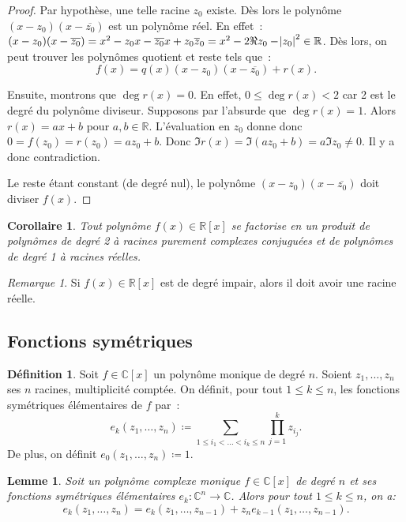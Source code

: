 \documentclass{article}
\newcommand{\R}{\mathbb R}
\newcommand{\C}{\mathbb C}
\newtheorem{cor}[thm]{Corollaire}
\newtheorem{lem}[thm]{Lemme}
\theoremstyle{definition}
\newtheorem{déf}[thm]{Définition}
\theoremstyle{remark}
\newtheorem*{rmq}{Remarque}
\begin{document}
		\begin{proof} Par hypothèse, une telle racine $z_0$ existe. Dès lors le polynôme $(x-z_0)(x-\overline {z_0})$ est un polynôme réel. En effet~:
		$(x-z_0)(x-\overline {z_0}) = x^2 -z_0x - \overline {z_0}x + z_0\overline z_0 = x^2 - 2\Re z_0 - \abs{z_0}^2 \in \R$. Dès lors, on peut trouver les polynômes
		quotient et reste tels que~: \[f(x) = q(x)(x-z_0)(x-\overline {z_0}) + r(x).\]

		Ensuite, montrons que $\deg r(x) = 0$. En effet, $0 \leq \deg r(x) < 2$ car 2 est le degré du polynôme diviseur. Supposons par l'absurde que $\deg r(x) = 1$.
		Alors $r(x) = ax+b$ pour $a, b \in \R$. L'évaluation en $z_0$ donne donc $0 = f(z_0) = r(z_0) = az_0+b$. Donc $\Im r(x) = \Im(az_0+b) = a\Im z_0 \neq 0$. Il y
		a donc contradiction.

		Le reste étant constant (de degré nul), le polynôme $(x-z_0)(x-\overline{z_0})$ doit diviser $f(x)$. \end{proof}

		\begin{cor} Tout polynôme $f(x) \in \R[x]$ se factorise en un produit de polynômes de degré 2 à racines purement complexes conjuguées et de polynômes de
		degré 1 à racines réelles. \end{cor}

		\begin{rmq} Si $f(x) \in \R[x]$ est de degré impair, alors il doit avoir une racine réelle. \end{rmq}

	\subsection{Fonctions symétriques}
		\begin{déf} Soit $f \in \C[x]$ un polynôme monique de degré $n$. Soient $z_1, \dotsc, z_n$ ses $n$ racines, multiplicité comptée. On définit, pour tout
		$1 \leq k \leq n$, les fonctions symétriques élémentaires de $f$ par~:
		\[e_k(z_1, \dotsc, z_n) \coloneqq \sum_{1 \leq i_1 < \ldots < i_k \leq n}\prod_{j=1}^kz_{i_j}.\]
		De plus, on définit $e_0(z_1, \dotsc, z_n) \coloneqq 1$. \end{déf}

		\begin{lem} Soit un polynôme complexe monique $f \in \C[x]$ de degré $n$ et ses fonctions symétriques élémentaires $e_k : \C^n \to \C$. Alors pour tout
		$1 \leq k \leq n$, on a: \[e_k(z_1, \dotsc, z_n) = e_k(z_1, \dotsc, z_{n-1}) + z_ne_{k-1}(z_1, \dotsc, z_{n-1}).\]\end{lem}
\end{document}
